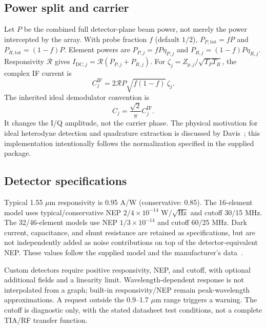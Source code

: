 \documentclass[11pt,letterpaper]{article}
\begin{document}
\subsection{Power split and carrier}
Let $P$ be the combined full detector-plane beam power, not merely the power
intercepted by the array. With probe fraction $f$ (default $1/2$),
$P_{P,\mathrm{tot}}=fP$ and $P_{R,\mathrm{tot}}=(1-f)P$.
Element powers are $P_{P,j}=fP\eta_{P,j}$ and
$P_{R,j}=(1-f)P\eta_{R,j}$. Responsivity $\mathcal R$ gives
$I_{\mathrm{DC},j}=\mathcal R(P_{P,j}+P_{R,j})$.
For $\zeta_j=Z_{p,j}/\sqrt{T_PT_R}$, the complex IF current is
\begin{equation}C_j^{\mathrm{IF}}=2\mathcal R P\sqrt{f(1-f)}\,\zeta_j.
\end{equation}
The inherited ideal demodulator convention is
\begin{equation}C_j=\frac{\sqrt{2}}{\pi}C_j^{\mathrm{IF}}.
\label{eq:carrier}
\end{equation}
It changes the I/Q amplitude, not the carrier phase. The physical motivation for
ideal heterodyne detection and quadrature extraction is discussed by
Davis~\cite{davis}; this implementation intentionally follows the normalization
specified in the supplied package.

\subsection{Detector specifications}
Typical 1.55 $\mu$m responsivity is 0.95 A/W (conservative: 0.85).
The 16-element model uses typical/conservative NEP $2/4\times10^{-14}$
$\mathrm{W}/\sqrt{\mathrm{Hz}}$ and cutoff 30/15 MHz. The 32/46-element models
use NEP $1/3\times10^{-14}$ and cutoff 60/25 MHz. Dark current, capacitance,
and shunt resistance are retained as specifications, but are not independently
added as noise contributions on top of the detector-equivalent NEP.
These values follow the supplied model and the manufacturer's data~\cite{hamamatsu}.

Custom detectors require positive responsivity, NEP, and cutoff, with optional
additional fields and a linearity limit. Wavelength-dependent response is not
interpolated from a graph; built-in responsivity/NEP remain peak-wavelength
approximations. A request outside the 0.9--1.7 $\mu$m range triggers a warning.
The cutoff is diagnostic only, with the stated datasheet test conditions, not
a complete TIA/RF transfer function.
\end{document}
